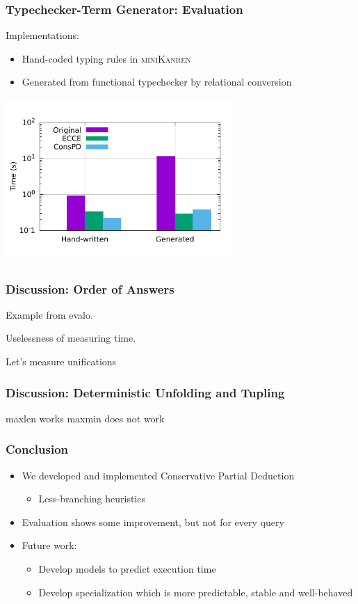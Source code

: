 \documentclass[xcolor=table]{beamer}
\newcommand{\mk}{\textsc{miniKanren}\xspace}
\begin{document}
\begin{frame}[fragile]
  \frametitle{Typechecker-Term Generator: Evaluation}

Implementations:
\begin{itemize}
  \item Hand-coded typing rules in \mk
  \item Generated from functional typechecker by relational conversion
\end{itemize}

  \begin{center}
    \includegraphics[width=0.65\textwidth]{pictures/type/ltypelog.pdf}
  \end{center}
\end{frame}

\begin{frame}[fragile]
  \frametitle{Discussion: Order of Answers}
Example from evalo.

Uselessness of measuring time.

Let's measure unifications
\end{frame}

\begin{frame}[fragile]
  \frametitle{Discussion: Deterministic Unfolding and Tupling}
maxlen works
maxmin does not work
\end{frame}


\begin{frame}[fragile]
  \frametitle{Conclusion}
  \begin{itemize}
    \item We developed and implemented Conservative Partial Deduction
    \begin{itemize}
      \item Less-branching heuristics
    \end{itemize}
    \item Evaluation shows some improvement, but not for every query
    \item Future work:
    \begin{itemize}
      \item Develop models to predict execution time
      \item Develop specialization which is more predictable, stable and well-behaved
    \end{itemize}
  \end{itemize}
\end{frame}
\end{document}
